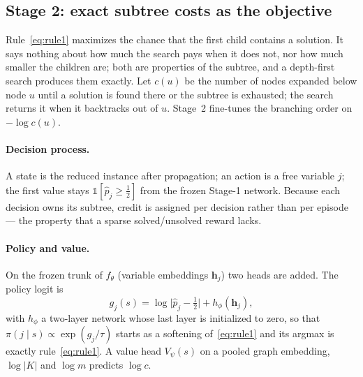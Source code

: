 \documentclass[final,5p,times,twocolumn]{elsarticle}
\begin{document}
\subsection{Stage 2: exact subtree costs as the objective}
\label{sec:method-stage2}

Rule~\eqref{eq:rule1} maximizes the chance that the first child contains a solution. It says nothing about how much the search pays when it does not, nor how much smaller the children are; both are properties of the subtree, and a depth-first search produces them exactly. Let $c(u)$ be the number of nodes expanded below node $u$ until a solution is found there or the subtree is exhausted; the search returns it when it backtracks out of $u$. Stage~2 fine-tunes the branching order on $-\log c(u)$.

\paragraph{Decision process.} A state is the reduced instance after propagation; an action is a free variable $j$; the first value stays $\mathbb{1}[\hat p_j\ge\frac12]$ from the frozen Stage-1 network. Because each decision owns its subtree, credit is assigned per decision rather than per episode --- the property that a sparse solved/unsolved reward lacks.

\paragraph{Policy and value.} On the frozen trunk of $f_\theta$ (variable embeddings $\mathbf{h}_j$) two heads are added. The policy logit is
\begin{equation}
g_j(s)=\log\bigl|\hat p_j-\tfrac12\bigr|+h_\phi(\mathbf{h}_j),
\label{eq:policy}
\end{equation}
with $h_\phi$ a two-layer network whose last layer is initialized to zero, so that $\pi(j\mid s)\propto\exp(g_j/\tau)$ starts as a softening of~\eqref{eq:rule1} and its argmax is exactly rule~\eqref{eq:rule1}. A value head $V_\psi(s)$ on a pooled graph embedding, $\log|K|$ and $\log m$ predicts $\log c$.
\end{document}
